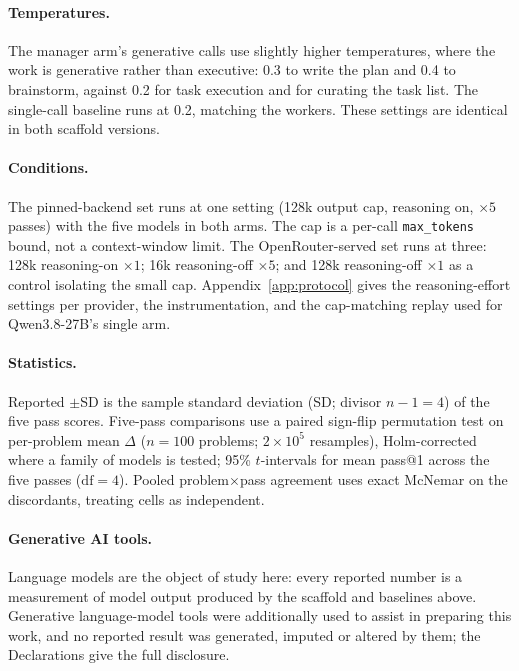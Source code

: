 \documentclass{article}
\begin{document}
\paragraph{Temperatures.} The manager arm's generative calls use slightly higher temperatures,
where the work is generative rather than executive: 0.3 to write the plan and 0.4 to brainstorm,
against 0.2 for task execution and for curating the task list. The single-call baseline runs at
0.2, matching the workers. These settings are identical in both scaffold versions.

\paragraph{Conditions.} The pinned-backend set runs at one setting (128k output cap,
reasoning on, $\times 5$ passes) with the five models in both arms. The cap is
a per-call \texttt{max\_tokens} bound, not a context-window limit. The OpenRouter-served set
runs at three: 128k reasoning-on $\times 1$; 16k reasoning-off $\times 5$; and 128k
reasoning-off $\times 1$ as a control isolating the small cap. Appendix~\ref{app:protocol}
gives the reasoning-effort settings per provider, the instrumentation, and the cap-matching
replay used for Qwen3.8-27B's single arm.

\paragraph{Statistics.} Reported $\pm$SD is the sample standard deviation (SD; divisor $n-1 = 4$) of the five
pass scores. Five-pass comparisons use a paired sign-flip permutation test on per-problem
mean $\Delta$ ($n = 100$ problems; $2\times10^{5}$ resamples), Holm-corrected where a family
of models is tested; 95\% $t$-intervals for mean pass@1 across the five passes
($\mathrm{df} = 4$). Pooled problem$\times$pass agreement uses exact McNemar on the
discordants, treating cells as independent.

\paragraph{Generative AI tools.} Language models are the object of study here: every
reported number is a measurement of model output produced by the scaffold and baselines
above. Generative language-model tools were additionally used to assist in preparing this
work, and no reported result was generated, imputed or altered by them; the Declarations
give the full disclosure.
\end{document}
